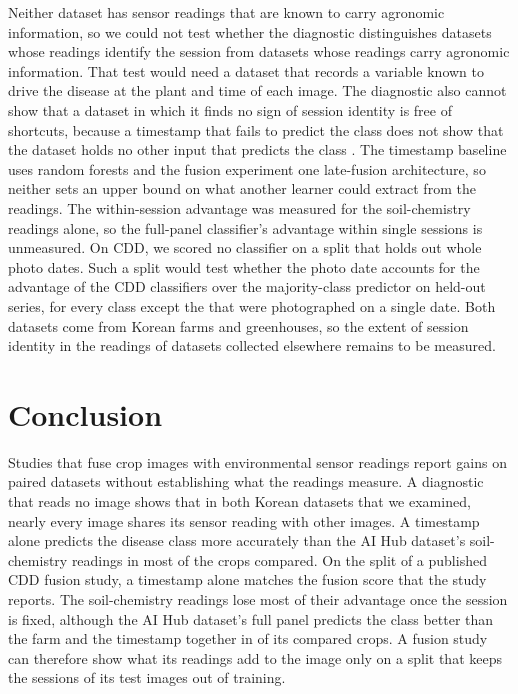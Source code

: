 \documentclass[preprint,12pt,authoryear,nopreprintline]{elsarticle}
\begin{document}
Neither dataset has sensor readings that are known to carry agronomic information, so
we could not test whether the diagnostic distinguishes datasets whose readings identify
the session from datasets whose readings carry agronomic information. That test would
need a dataset that records a variable known to drive the disease at the plant and time
of each image. The diagnostic also cannot show that a dataset in which it finds no sign of session
identity is free of shortcuts, because a timestamp that fails to predict the class does not show
that the dataset holds no other input that predicts the class
\citep{feng2019misleading}. The timestamp baseline uses random
forests and the fusion experiment one late-fusion architecture, so neither sets an
upper bound on what another learner could extract from the readings. The
within-session advantage was measured for the soil-chemistry readings alone, so the full-panel classifier's advantage within single sessions is unmeasured. On CDD,
we scored no classifier on a split that holds out whole photo dates. Such a split would test whether the photo date accounts for the advantage of the CDD
classifiers over the majority-class predictor on held-out series, for
every class except the \cddSingleDateClasses{} that were photographed on a single
date. Both datasets
come from Korean farms and greenhouses, so the extent of session identity in the
readings of datasets collected elsewhere remains to be measured.

\section{Conclusion}
\label{sec:conclusion}

Studies that fuse crop images with environmental sensor readings report gains on
paired datasets without establishing what the readings measure. A diagnostic that
reads no image shows that in both Korean datasets that we examined, nearly every image
shares its sensor reading with other images. A timestamp alone predicts the disease
class more accurately than the AI Hub dataset's soil-chemistry readings in most of
the crops compared. On the split of a published CDD fusion study, a timestamp alone
matches the fusion score that the study reports. The soil-chemistry readings lose
most of their advantage once the session is fixed, although the AI Hub dataset's
full panel predicts the class better than the farm and the timestamp together in
\fullBeyondFarmCrops{} of its \timestampCrops{} compared crops. A fusion study can
therefore show what its readings add to the image only on a split that keeps the
sessions of its test images out of training.
\end{document}
